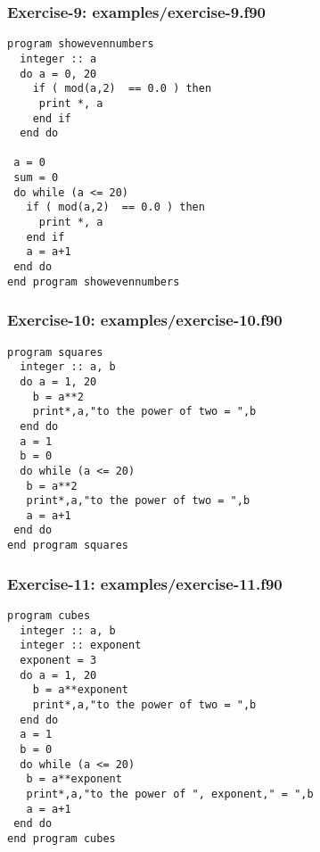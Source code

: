 \documentclass[xcolor=dvipsnames,dvip,notes=show,table]{beamer}
\begin{document}
\begin{frame}[fragile]
\frametitle{Exercise-9: examples/exercise-9.f90}
\scriptsize
\begin{lstlisting}
program showevennumbers
  integer :: a
  do a = 0, 20
    if ( mod(a,2)  == 0.0 ) then 
	 print *, a 
    end if	
  end do

 a = 0
 sum = 0
 do while (a <= 20) 
   if ( mod(a,2)  == 0.0 ) then 
     print *, a 
   end if	
   a = a+1
 end do
end program showevennumbers
\end{lstlisting}
\end{frame}





\begin{frame}[fragile]
\frametitle{Exercise-10: examples/exercise-10.f90}
\tiny
\begin{lstlisting}
program squares
  integer :: a, b
  do a = 1, 20
    b = a**2
    print*,a,"to the power of two = ",b
  end do
  a = 1
  b = 0
  do while (a <= 20) 
   b = a**2
   print*,a,"to the power of two = ",b
   a = a+1
 end do
end program squares
\end{lstlisting}
\end{frame}



\begin{frame}[fragile]
\frametitle{Exercise-11: examples/exercise-11.f90}
\tiny
\begin{lstlisting}
program cubes
  integer :: a, b
  integer :: exponent
  exponent = 3
  do a = 1, 20
    b = a**exponent
    print*,a,"to the power of two = ",b
  end do
  a = 1
  b = 0
  do while (a <= 20) 
   b = a**exponent
   print*,a,"to the power of ", exponent," = ",b
   a = a+1
 end do
end program cubes
\end{lstlisting}
\end{frame}


\end{document}
